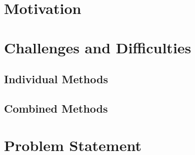 \newpage
    \section{Motivation}

    \section{Challenges and Difficulties}
    \subsection{Individual Methods}
    
    \subsection{Combined Methods}

    \section{Problem Statement}
    

